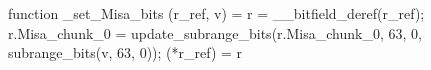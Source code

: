 function _set_Misa_bits (r_ref, v) = {
    r = __bitfield_deref(r_ref);
    r.Misa_chunk_0 = update_subrange_bits(r.Misa_chunk_0, 63, 0, subrange_bits(v, 63, 0));
    (*r_ref) = r
}
